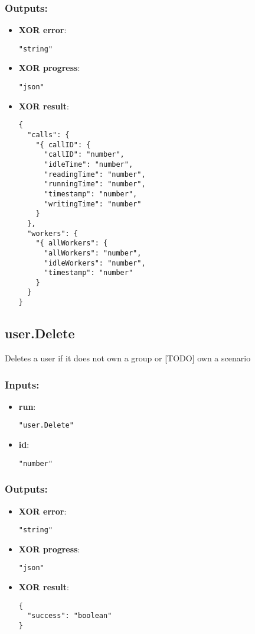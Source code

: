 \subsubsection*{Outputs:}
\begin{itemize}
    \item \textbf{XOR error}: 
\begin{lstlisting}
"string"
\end{lstlisting}
    \item \textbf{XOR progress}: 
\begin{lstlisting}
"json"
\end{lstlisting}
    \item \textbf{XOR result}: 
\begin{lstlisting}
{
  "calls": {
    "{ callID": {
      "callID": "number", 
      "idleTime": "number", 
      "readingTime": "number", 
      "runningTime": "number", 
      "timestamp": "number", 
      "writingTime": "number"
    }
  }, 
  "workers": {
    "{ allWorkers": {
      "allWorkers": "number", 
      "idleWorkers": "number", 
      "timestamp": "number"
    }
  }
}
\end{lstlisting}
  \end{itemize}

\subsection{user.Delete}
Deletes a user if it does not own a group or [TODO] own a scenario
\subsubsection*{Inputs:}
\begin{itemize}
    \item \textbf{run}: 
\begin{lstlisting}
"user.Delete"
\end{lstlisting}
    \item \textbf{id}: 
\begin{lstlisting}
"number"
\end{lstlisting}
  \end{itemize}

\subsubsection*{Outputs:}
\begin{itemize}
    \item \textbf{XOR error}: 
\begin{lstlisting}
"string"
\end{lstlisting}
    \item \textbf{XOR progress}: 
\begin{lstlisting}
"json"
\end{lstlisting}
    \item \textbf{XOR result}: 
\begin{lstlisting}
{
  "success": "boolean"
}
\end{lstlisting}
  \end{itemize}


